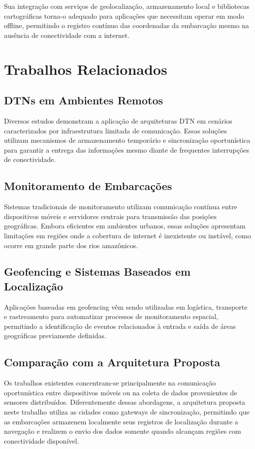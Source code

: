 \documentclass[12pt]{article}
\begin{document}
Sua integração com serviços de geolocalização, armazenamento local e bibliotecas cartográficas torna-o adequado para aplicações que necessitam operar em modo offline, permitindo o registro contínuo das coordenadas da embarcação mesmo na ausência de conectividade com a internet.

\section{Trabalhos Relacionados}
\subsection{DTNs em Ambientes Remotos}
Diversos estudos demonstram a aplicação de arquiteturas DTN em cenários caracterizados por infraestrutura limitada de comunicação. Essas soluções utilizam mecanismos de armazenamento temporário e sincronização oportunística para garantir a entrega das informações mesmo diante de frequentes interrupções de conectividade.

\subsection{Monitoramento de Embarcações}
Sistemas tradicionais de monitoramento utilizam comunicação contínua entre dispositivos móveis e servidores centrais para transmissão das posições geográficas. Embora eficientes em ambientes urbanos, essas soluções apresentam limitações em regiões onde a cobertura de internet é inexistente ou instável, como ocorre em grande parte dos rios amazônicos.

\subsection{Geofencing e Sistemas Baseados em Localização}
Aplicações baseadas em geofencing vêm sendo utilizadas em logística, transporte e rastreamento para automatizar processos de monitoramento espacial, permitindo a identificação de eventos relacionados à entrada e saída de áreas geográficas previamente definidas.

\subsection{Comparação com a Arquitetura Proposta}
Os trabalhos existentes concentram-se principalmente na comunicação oportunística entre dispositivos móveis ou na coleta de dados provenientes de sensores distribuídos. Diferentemente dessas abordagens, a arquitetura proposta neste trabalho utiliza as cidades como gateways de sincronização, permitindo que as embarcações armazenem localmente seus registros de localização durante a navegação e realizem o envio dos dados somente quando alcançam regiões com conectividade disponível.
\end{document}
